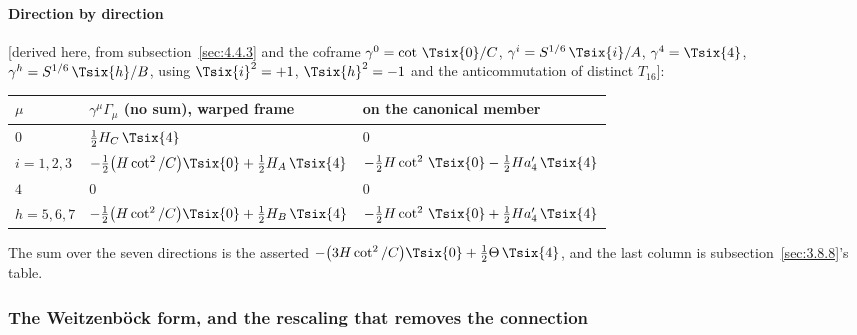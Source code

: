 \paragraph{Direction by direction} [derived here, from subsection~\ref{sec:4.4.3} and the coframe
$\gamma^0=\cot\,\Tsix{0}/C$, $\gamma^i=S^{1/6}\,\Tsix{i}/A$, $\gamma^4=\Tsix{4}$,
$\gamma^h=S^{1/6}\,\Tsix{h}/B$, using $\Tsix{i}^2=+1$, $\Tsix{h}^2=-1$ and the anticommutation of distinct
$T_{16}$]:
\begin{center}
\renewcommand{\arraystretch}{1.35}
\begin{tabular}{@{}lll@{}}
\toprule
$\mu$ & $\gamma^\mu\Gamma_\mu$ (no sum), warped frame & on the canonical member\\
\midrule
$0$ & $\tfrac12H_C\,\Tsix{4}$ & $0$\\
$i=1,2,3$ & $-\tfrac12\bigl(H\cot^2/C\bigr)\Tsix{0}+\tfrac12H_A\,\Tsix{4}$ & $-\tfrac12H\cot^2\,\Tsix{0}-\tfrac12Ha_4'\,\Tsix{4}$\\
$4$ & $0$ & $0$\\
$h=5,6,7$ & $-\tfrac12\bigl(H\cot^2/C\bigr)\Tsix{0}+\tfrac12H_B\,\Tsix{4}$ & $-\tfrac12H\cot^2\,\Tsix{0}+\tfrac12Ha_4'\,\Tsix{4}$\\
\bottomrule
\end{tabular}
\end{center}
The sum over the seven directions is the asserted $-\bigl(3H\cot^2/C\bigr)\Tsix{0}+\tfrac12\Theta\,\Tsix{4}$,
and the last column is subsection~\ref{sec:3.8.8}'s table.

\subsubsection{The Weitzenb\"ock form, and the rescaling that removes the connection}
\label{sec:4.4.5}

